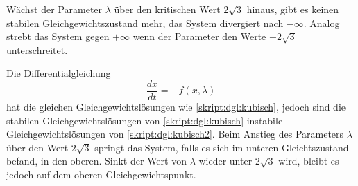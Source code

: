 Wächst der Parameter $\lambda$ über den kritischen Wert $2\sqrt{3}$
hinaus, gibt es keinen stabilen Gleichgewichtszustand mehr, das System
divergiert nach $-\infty$. 
Analog strebt das System gegen $+\infty$ wenn der Parameter den Werte
$-2\sqrt{3}$ unterschreitet.

Die Differentialgleichung 
\begin{equation}
\frac{dx}{dt}
=
-f(x,\lambda)
\label{skript:dgl:kubisch2}
\end{equation}
hat die gleichen Gleichgewichtslösungen wie \eqref{skript:dgl:kubisch},
jedoch sind die stabilen Gleichgewichtslösungen von \eqref{skript:dgl:kubisch}
instabile Gleichgewichtslösungen von \eqref{skript:dgl:kubisch2}.
Beim Anstieg des Parameters $\lambda$ über den Wert $2\sqrt{3}$
springt das System, falls es sich im unteren Gleichtszustand befand,
in den oberen.
Sinkt der Wert von $\lambda$ wieder unter $2\sqrt{3}$ wird, bleibt
es jedoch auf dem oberen Gleichgewichtspunkt.


